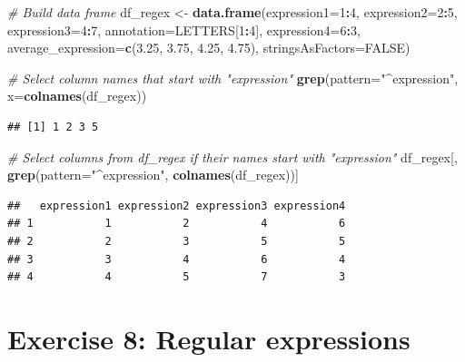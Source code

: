 \documentclass[]{book}
\newenvironment{Shaded}{\begin{snugshade}}{\end{snugshade}}
\newcommand{\CommentTok}[1]{\textcolor[rgb]{0.56,0.35,0.01}{\textit{#1}}}
\newcommand{\DataTypeTok}[1]{\textcolor[rgb]{0.13,0.29,0.53}{#1}}
\newcommand{\DecValTok}[1]{\textcolor[rgb]{0.00,0.00,0.81}{#1}}
\newcommand{\FloatTok}[1]{\textcolor[rgb]{0.00,0.00,0.81}{#1}}
\newcommand{\KeywordTok}[1]{\textcolor[rgb]{0.13,0.29,0.53}{\textbf{#1}}}
\newcommand{\NormalTok}[1]{#1}
\newcommand{\OperatorTok}[1]{\textcolor[rgb]{0.81,0.36,0.00}{\textbf{#1}}}
\newcommand{\OtherTok}[1]{\textcolor[rgb]{0.56,0.35,0.01}{#1}}
\newcommand{\StringTok}[1]{\textcolor[rgb]{0.31,0.60,0.02}{#1}}
\begin{document}
\begin{Shaded}
\begin{Highlighting}[]
\CommentTok{# Build data frame}
\NormalTok{df_regex <-}\StringTok{ }\KeywordTok{data.frame}\NormalTok{(}\DataTypeTok{expression1=}\DecValTok{1}\OperatorTok{:}\DecValTok{4}\NormalTok{, }
    \DataTypeTok{expression2=}\DecValTok{2}\OperatorTok{:}\DecValTok{5}\NormalTok{, }
    \DataTypeTok{expression3=}\DecValTok{4}\OperatorTok{:}\DecValTok{7}\NormalTok{, }
    \DataTypeTok{annotation=}\NormalTok{LETTERS[}\DecValTok{1}\OperatorTok{:}\DecValTok{4}\NormalTok{], }
    \DataTypeTok{expression4=}\DecValTok{6}\OperatorTok{:}\DecValTok{3}\NormalTok{, }
    \DataTypeTok{average_expression=}\KeywordTok{c}\NormalTok{(}\FloatTok{3.25}\NormalTok{, }\FloatTok{3.75}\NormalTok{, }\FloatTok{4.25}\NormalTok{, }\FloatTok{4.75}\NormalTok{),}
    \DataTypeTok{stringsAsFactors=}\OtherTok{FALSE}\NormalTok{)}

\CommentTok{# Select column names that start with "expression"}
\KeywordTok{grep}\NormalTok{(}\DataTypeTok{pattern=}\StringTok{"^expression"}\NormalTok{, }
    \DataTypeTok{x=}\KeywordTok{colnames}\NormalTok{(df_regex))}
\end{Highlighting}
\end{Shaded}

\begin{verbatim}
## [1] 1 2 3 5
\end{verbatim}

\begin{Shaded}
\begin{Highlighting}[]
\CommentTok{# Select columns from df_regex if their names start with "expression"}
\NormalTok{df_regex[, }\KeywordTok{grep}\NormalTok{(}\DataTypeTok{pattern=}\StringTok{"^expression"}\NormalTok{, }\KeywordTok{colnames}\NormalTok{(df_regex))]}
\end{Highlighting}
\end{Shaded}

\begin{verbatim}
##   expression1 expression2 expression3 expression4
## 1           1           2           4           6
## 2           2           3           5           5
## 3           3           4           6           4
## 4           4           5           7           3
\end{verbatim}

\hypertarget{exercise-8-regular-expressions}{%
\section{Exercise 8: Regular expressions}\label{exercise-8-regular-expressions}}
\end{document}
